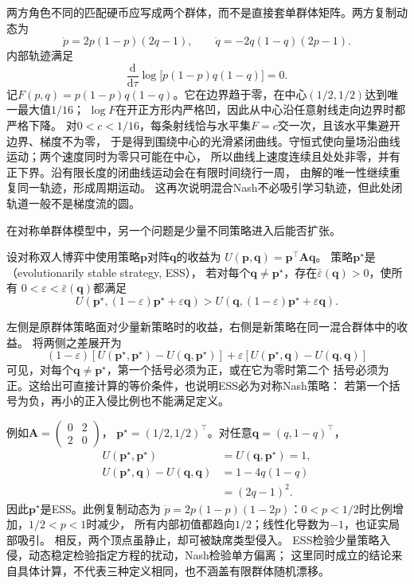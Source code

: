两方角色不同的匹配硬币应写成两个群体，而不是直接套单群体矩阵。两方复制动态为
\[
  \dot p=2p(1-p)(2q-1),\qquad
  \dot q=-2q(1-q)(2p-1).
\]
内部轨迹满足
\[
  \frac{\mathrm d}{\mathrm d\tau}
  \log\!\bigl[p(1-p)q(1-q)\bigr]=0.
\]
记$F(p,q)=p(1-p)q(1-q)$。它在边界趋于零，在中心$(1/2,1/2)$达到唯一最大值$1/16$；
$\log F$在开正方形内严格凹，因此从中心沿任意射线走向边界时都严格下降。
对$0<c<1/16$，每条射线恰与水平集$F=c$交一次，且该水平集避开边界、梯度不为零，
于是得到围绕中心的光滑紧闭曲线。守恒式使向量场沿曲线运动；两个速度同时为零只可能在中心，
所以曲线上速度连续且处处非零，并有正下界。沿有限长度的闭曲线运动会在有限时间绕行一周，
由解的唯一性继续重复同一轨迹，形成周期运动。
这再次说明混合Nash不必吸引学习轨迹，但此处闭轨道一般不是梯度流的圆。

在对称单群体模型中，另一个问题是少量不同策略进入后能否扩张。
\begin{definition}[演化稳定策略]
\label{def:game-evolutionarily-stable}
设对称双人博弈中使用策略\(\bm p\)对阵\(\bm q\)的收益为
\(U(\bm p,\bm q)=\bm p^\top\bm A\bm q\)。
策略\(\bm p^\star\)是（evolutionarily stable strategy, ESS），
若对每个\(\bm q\ne\bm p^\star\)，存在\(\bar\varepsilon(\bm q)>0\)，使所有
\(0<\varepsilon<\bar\varepsilon(\bm q)\)都满足
\[
  U(\bm p^\star,(1-\varepsilon)\bm p^\star+\varepsilon\bm q)
  >
  U(\bm q,(1-\varepsilon)\bm p^\star+\varepsilon\bm q).
\]
\end{definition}
左侧是原群体策略面对少量新策略时的收益，右侧是新策略在同一混合群体中的收益。
将两侧之差展开为
\[
  (1-\varepsilon)
  [U(\bm p^\star,\bm p^\star)-U(\bm q,\bm p^\star)]
  +\varepsilon[U(\bm p^\star,\bm q)-U(\bm q,\bm q)]
\]
可见，对每个\(\bm q\ne\bm p^\star\)，第一个括号必须为正，或在它为零时第二个
括号必须为正。这给出可直接计算的等价条件，也说明ESS必为对称Nash策略：
若第一个括号为负，再小的正入侵比例也不能满足定义。

例如\(\bm A=\left(\begin{smallmatrix}0&2\\2&0\end{smallmatrix}\right)\)，
\(\bm p^\star=(1/2,1/2)^\top\)。对任意\(\bm q=(q,1-q)^\top\)，
\[
  \begin{aligned}
    U(\bm p^\star,\bm p^\star)&=U(\bm q,\bm p^\star)=1,\\
    U(\bm p^\star,\bm q)-U(\bm q,\bm q)&=1-4q(1-q)\\
      &=(2q-1)^2.
  \end{aligned}
\]
因此\(\bm p^\star\)是ESS。此例复制动态为
\(\dot p=2p(1-p)(1-2p)\)：\(0<p<1/2\)时比例增加，\(1/2<p<1\)时减少，
所有内部初值都趋向\(1/2\)；线性化导数为\(-1\)，也证实局部吸引。
相反，两个顶点虽静止，却可被缺席类型侵入。
ESS检验少量策略入侵，动态稳定检验指定方程的扰动，Nash检验单方偏离；
这里同时成立的结论来自具体计算，不代表三种定义相同，也不涵盖有限群体随机漂移。

